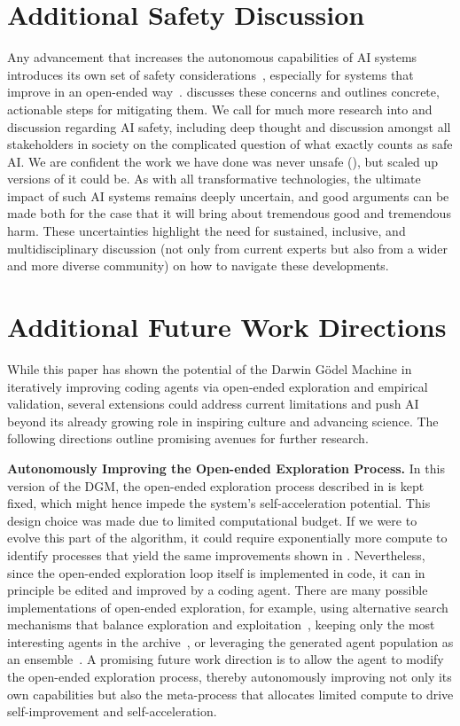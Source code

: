 \documentclass{article}
\begin{document}
\section{Additional Safety Discussion}
\label{app:safety}

Any advancement that increases the autonomous capabilities of AI systems introduces its own set of safety considerations~\citep{bengio2024managing}, especially for systems that improve in an open-ended way~\citep{ecoffet2020open, clune2019ai}.  discusses these concerns and outlines concrete, actionable steps for mitigating them. We call for much more research into and discussion regarding AI safety, including deep thought and discussion amongst all stakeholders in society on the complicated question of what exactly counts as safe AI. We are confident the work we have done was never unsafe (), but scaled up versions of it could be. As with all transformative technologies, the ultimate impact of such AI systems remains deeply uncertain, and good arguments can be made both for the case that it will bring about tremendous good and tremendous harm. These uncertainties highlight the need for sustained, inclusive, and multidisciplinary discussion (not only from current experts but also from a wider and more diverse community) on how to navigate these developments.

\section{Additional Future Work Directions}
\label{app:future-work}

While this paper has shown the potential of the Darwin G\"odel Machine in iteratively improving coding agents via open‐ended exploration and empirical validation, several extensions could address current limitations and push AI beyond its already growing role in inspiring culture and advancing science. The following directions outline promising avenues for further research.

\textbf{Autonomously Improving the Open-ended Exploration Process.}
In this version of the DGM, the open-ended exploration process described in  is kept fixed, which might hence impede the system's self-acceleration potential. This design choice was made due to limited computational budget. If we were to evolve this part of the algorithm, it could require exponentially more compute to identify processes that yield the same improvements shown in . Nevertheless, since the open-ended exploration loop itself is implemented in code, it can in principle be edited and improved by a coding agent. There are many possible implementations of open-ended exploration, for example, using alternative search mechanisms that balance exploration and exploitation~\citep{herr2025llm}, keeping only the most interesting agents in the archive~\citep{faldor2025omni}, or leveraging the generated agent population as an ensemble~\citep{samvelyan2024rainbow}. A promising future work direction is to allow the agent to modify the open-ended exploration process, thereby autonomously improving not only its own capabilities but also the meta-process that allocates limited compute to drive self-improvement and self-acceleration.
\end{document}
